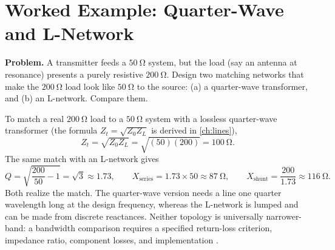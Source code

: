 \section{Worked Example: Quarter-Wave and L-Network}
\textbf{Problem.} A transmitter feeds a \(\SI{50}{\ohm}\) system, but the load
(say an antenna at resonance) presents a purely resistive \(\SI{200}{\ohm}\).
Design two matching networks that make the \(\SI{200}{\ohm}\) load look like
\(\SI{50}{\ohm}\) to the source: (a) a quarter-wave transformer, and (b) an
L-network. Compare them.

To match a real \(\SI{200}{\ohm}\) load to a \(\SI{50}{\ohm}\) system with a
lossless quarter-wave transformer (the formula \(Z_t=\sqrt{Z_0Z_L}\) is derived in
\cref{ch:lines}),
\[
Z_t=\sqrt{Z_0Z_L}=\sqrt{(50)(200)}=\SI{100}{\ohm}.
\]
The same match with an L-network gives
\[
Q=\sqrt{\frac{200}{50}-1}=\sqrt{3}\approx1.73,
\qquad
X_{\text{series}}=1.73\times50\approx\SI{87}{\ohm},
\qquad
X_{\text{shunt}}=\frac{200}{1.73}\approx\SI{116}{\ohm}.
\]
Both realize the match. The quarter-wave version needs a line one quarter wavelength
long at the design frequency, whereas the L-network is lumped and can be made from
discrete reactances. Neither topology is universally narrower-band: a bandwidth
comparison requires a specified return-loss criterion, impedance ratio, component
losses, and implementation \cite[pp.~63--68]{bowick2008rfcircuit}
\cite[pp.~63--64]{free2022rfmicrowave}.
